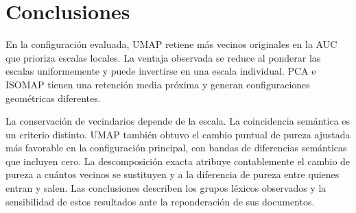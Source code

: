 \section{Conclusiones}
En la configuración evaluada, UMAP retiene más vecinos originales en la AUC que prioriza escalas locales. La ventaja observada se reduce al ponderar las escalas uniformemente y puede invertirse en una escala individual. PCA e ISOMAP tienen una retención media próxima y generan configuraciones geométricas diferentes.

La conservación de vecindarios depende de la escala. La coincidencia semántica es un criterio distinto. UMAP también obtuvo el cambio puntual de pureza ajustada más favorable en la configuración principal, con bandas de diferencias semánticas que incluyen cero. La descomposición exacta atribuye contablemente el cambio de pureza a cuántos vecinos se sustituyen y a la diferencia de pureza entre quienes entran y salen. Las conclusiones describen los grupos léxicos observados y la sensibilidad de estos resultados ante la reponderación de sus documentos.
